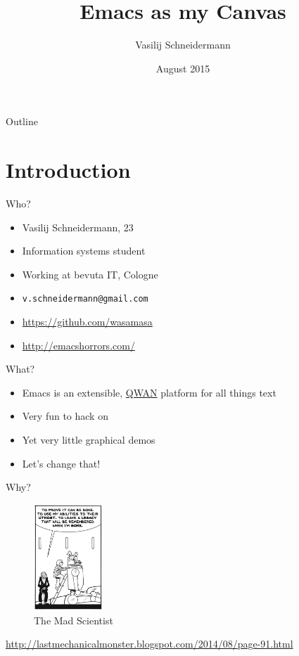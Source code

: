 \documentclass[presentation]{beamer}
\author{Vasilij Schneidermann}
\date{August 2015}
\title{Emacs as my Canvas}
\begin{document}
\maketitle
\begin{frame}{Outline}
\tableofcontents
\end{frame}

\AtBeginSection{\frame{\sectionpage}}

\section{Introduction}
\label{sec-1}

\begin{frame}[label=sec-1-1]{Who?}
\begin{itemize}
\item Vasilij Schneidermann, 23
\item Information systems student
\item Working at bevuta IT, Cologne
\item \texttt{v.schneidermann@gmail.com}
\item \url{https://github.com/wasamasa}
\item \url{http://emacshorrors.com/}
\end{itemize}
\end{frame}

\begin{frame}[label=sec-1-2]{What?}
\begin{itemize}
\item Emacs is an extensible, \href{http://steve-yegge.blogspot.de/2007/01/pinocchio-problem.html}{QWAN} platform for all things text
\item Very fun to hack on
\item Yet very little graphical demos
\item Let's change that!
\end{itemize}
\end{frame}

\begin{frame}[label=sec-1-3]{Why?}
\begin{figure}[htb]
\centering
\includegraphics[height=4cm]{./images/why.jpg}
\caption{The Mad Scientist}
\end{figure}

\url{http://lastmechanicalmonster.blogspot.com/2014/08/page-91.html}
\end{frame}
\end{document}

